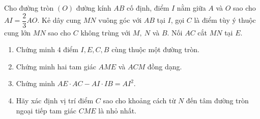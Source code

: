 \begin{ex}%
	Cho đường tròn $(O)$ đường kính $AB$ cố định, điểm $I$ nằm giữa $A$ và $O$ sao cho $AI=\dfrac{2}{3}AO$. Kẻ dây cung $MN$ vuông góc với $AB$ tại $I$, gọi $C$ là điểm tùy ý thuộc cung lớn $MN$ sao cho $C$ không trùng với $M,\ N$ và $B$. Nối $AC$ cắt $MN$ tại $E$.
	\begin{enumerate}
		\item Chứng minh $4$ điểm $I,E,C,B$ cùng thuộc một đường tròn.
		\item Chứng minh hai tam giác $AME$ và $ACM$ đồng dạng.
		\item Chứng minh $AE\cdot AC-AI\cdot IB=AI^2$.
		\item Hãy xác định vị trí điểm $C$ sao cho khoảng cách từ $N$ đến tâm đường tròn ngoại tiếp tam giác $CME$ là nhỏ nhất.
	\end{enumerate}
\end{ex}
